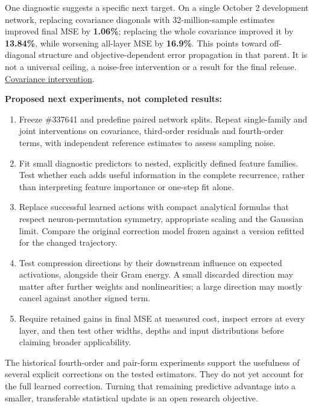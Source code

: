 \documentclass[11pt,letterpaper]{article}
\providecommand{\tightlist}{\setlength{\itemsep}{0pt}\setlength{\parskip}{0pt}}
\begin{document}
One diagnostic suggests a specific next target. On a single October 2 development network, replacing covariance diagonals with 32-million-sample estimates improved final MSE by \textbf{1.06\%}; replacing the whole covariance improved it by \textbf{13.84\%}, while worsening all-layer MSE by \textbf{16.9\%}. This points toward off-diagonal structure and objective-dependent error propagation in that parent. It is not a universal ceiling, a noise-free intervention or a result for the final release. \href{https://github.com/mattliston/arc-whitebox-estimation-challenge/tree/main/experiments/covariance-structure/exact-post-covariance-diagonal-lowers-final-mse-only-1/}{Covariance intervention}.

\textbf{Proposed next experiments, not completed results:}

\begin{enumerate}
\def\labelenumi{\arabic{enumi}.}
\tightlist
\item
  Freeze \#337641 and predefine paired network splits. Repeat single-family and joint interventions on covariance, third-order residuals and fourth-order terms, with independent reference estimates to assess sampling noise.
\item
  Fit small diagnostic predictors to nested, explicitly defined feature families. Test whether each adds useful information in the complete recurrence, rather than interpreting feature importance or one-step fit alone.
\item
  Replace successful learned actions with compact analytical formulas that respect neuron-permutation symmetry, appropriate scaling and the Gaussian limit. Compare the original correction model frozen against a version refitted for the changed trajectory.
\item
  Test compression directions by their downstream influence on expected activations, alongside their Gram energy. A small discarded direction may matter after further weights and nonlinearities; a large direction may mostly cancel against another signed term.
\item
  Require retained gains in final MSE at measured cost, inspect errors at every layer, and then test other widths, depths and input distributions before claiming broader applicability.
\end{enumerate}

The historical fourth-order and pair-form experiments support the usefulness of several explicit corrections on the tested estimators. They do not yet account for the full learned correction. Turning that remaining predictive advantage into a smaller, transferable statistical update is an open research objective.
\end{document}
